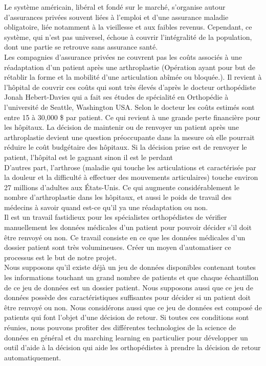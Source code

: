 \documentclass[12pt, french]{article}
\begin{document}
Le système américain, libéral et fondé sur le marché, s’organise autour d’assurances privées souvent liées à l’emploi et d’une assurance maladie obligatoire, liée notamment à la vieillesse et aux faibles revenus.
Cependant, ce système, qui n’est pas universel, échoue à couvrir l’intégralité de la population, dont une partie se retrouve sans assurance santé.\\

Les compagnies d'assurance privées ne couvrent pas les coûts associés à une réadaptation d'un patient après une arthroplastie (Opération ayant pour but de rétablir la forme et la mobilité d'une articulation abîmée ou bloquée.). Il revient à l'hôpital de couvrir ces coûts qui sont très élevés d'après le docteur orthopédiste Jonah Hebert-Davies qui a fait ses études de spécialité en Orthopédie à l'université de Seattle, Washington USA. Selon le docteur les coûts estimés sont entre 15 à 30,000 \$ par patient. Ce qui revient à une grande perte financière pour les hôpitaux.  La décision de maintenir ou de renvoyer un patient après une arthroplastie devient une question préoccupante dans la mesure où elle pourrait réduire le coût budgétaire des hôpitaux. Si la décision prise est de renvoyer le patient, l'hôpital est le gagnant sinon il est le perdant\\ 

D'autres part, l'arthrose (maladie qui touche les articulations et caractérisée par la douleur et la difficulté à effectuer des mouvements articulaires) touche environ 27 millions d'adultes aux États-Unis.  Ce qui augmente considérablement le nombre d'arthroplastie dans les hôpitaux, et aussi le poids de travail des médecins à savoir quand est-ce qu'il ya une réadaptation ou non.\\

Il est un travail fastidieux pour les spécialistes orthopédistes de vérifier manuellement les données médicales d'un patient pour pouvoir décider s'il doit être renvoyé ou non. Ce travail consiste en ce que les données médicales d'un dossier patient sont très volumineuses. Créer un moyen d'automatiser ce processus est le but de notre projet.  \\

Nous supposons qu'il existe déjà un jeu de données disponibles contenant toutes les informations touchant un grand nombre de patients et que chaque échantillon de ce jeu de données est un dossier patient. Nous supposons aussi que ce jeu de données possède des caractéristiques suffisantes pour décider si un patient doit être renvoyé ou non. Nous considérons aussi que ce jeu de données est composé de patients qui font l'objet d'une décision de retour. Si toutes ces conditions sont réunies, nous pouvons profiter des différentes technologies de la science de données en général et du marching learning en particulier pour développer un outil d'aide à la décision qui aide les orthopédistes à prendre la décision de retour automatiquement. \\
\end{document}
